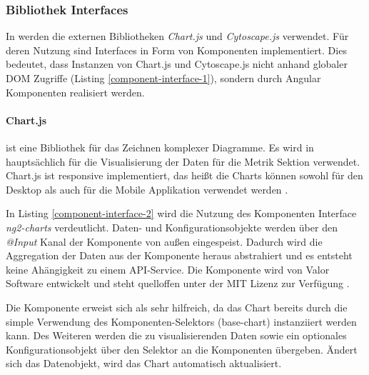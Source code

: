 \subsubsection{Bibliothek Interfaces}

In \projectname{} werden die externen Bibliotheken \emph{Chart.js} und \emph{Cytoscape.js} verwendet.
Für deren Nutzung sind Interfaces in Form von Komponenten implementiert.
Dies bedeutet, dass Instanzen von Chart.js und Cytoscape.js nicht anhand globaler \ac{DOM} Zugriffe (Listing \ref{component-interface-1}),
sondern durch Angular Komponenten realisiert werden.


\paragraph{Chart.js} ist eine Bibliothek für das Zeichnen komplexer Diagramme.
Es wird in \projectname{} hauptsächlich für die Visualisierung der Daten für die Metrik Sektion verwendet.
Chart.js ist responsive implementiert, das heißt die Charts können sowohl für den Desktop
als auch für die Mobile Applikation verwendet werden \cite{Chart80:online}.

\vspace{0.3cm}



\vspace{0.3cm}
In Listing \ref{component-interface-2} wird die Nutzung des Komponenten Interface \emph{ng2-charts} verdeutlicht.
Daten- und Konfigurationsobjekte werden über den \emph{@Input} Kanal der Komponente von außen eingespeist.
Dadurch wird die Aggregation der Daten aus der Komponente heraus abstrahiert und es entsteht keine Ahängigkeit zu einem API-Service.
Die Komponente wird von Valor Software entwickelt und steht quelloffen unter der MIT Lizenz zur Verfügung \cite{valor6:online}.

Die Komponente erweist sich als sehr hilfreich, da das Chart bereits durch die simple Verwendung des Komponenten-Selektors (base-chart) instanziiert werden kann.
Des Weiteren werden die zu visualisierenden Daten sowie ein optionales Konfigurationsobjekt über den Selektor an die Komponenten übergeben.
Ändert sich das Datenobjekt, wird das Chart automatisch aktualisiert.



